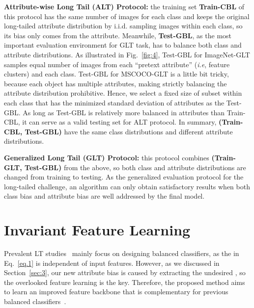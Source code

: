 \documentclass{article}
\def\ie{\emph{i.e}} \def\Ie{\emph{I.e}}
\begin{document}
\noindent\textbf{Attribute-wise Long Tail (ALT) Protocol:} the training set \textbf{Train-CBL} of this protocol has the same number of images for each class and keeps the original long-tailed attribute distribution by i.i.d. sampling images within each class, so its bias only comes from the attribute. Meanwhile, \textbf{Test-GBL}, as the most important evaluation environment for GLT task, has to balance both class and attribute distributions. As illustrated in Fig.~\ref{fig:4}, Test-GBL for ImageNet-GLT samples equal number of images from each ``pretext attribute'' (\ie, feature clusters) and each class. Test-GBL for MSCOCO-GLT is a little bit tricky, because each object has multiple attributes, making strictly balancing the attribute distribution prohibitive. Hence, we select a fixed size of subset within each class that has the minimized standard deviation of attributes as the Test-GBL. As long as Test-GBL is relatively more balanced in attributes than Train-CBL, it can serve as a valid testing set for ALT protocol. In summary, \textbf{(Train-CBL, Test-GBL)} have the same class distributions and different attribute distributions. 



\noindent\textbf{Generalized Long Tail (GLT) Protocol:} this protocol combines \textbf{(Train-GLT, Test-GBL)} from the above, so both class and attribute distributions are changed from training to testing. As the generalized evaluation protocol for the long-tailed challenge, an algorithm can only obtain satisfactory results when both class bias and attribute bias are well addressed by the final model.






















 
\section{Invariant Feature Learning}
\label{sec:4}



Prevalent LT studies~\cite{menon2020long,kang2019decoupling} mainly focus on designing balanced classifiers, as the  in Eq.~\eqref{eq.1} is independent of input features. However, as we discussed in Section~\ref{sec:3},  our new attribute bias is caused by extracting the undesired , so the overlooked feature learning is the key. Therefore, the proposed method aims to learn an improved feature backbone that is complementary for previous balanced classifiers~\cite{kang2019decoupling,tang2020long,ren2020balanced,menon2020long}. 
\end{document}
